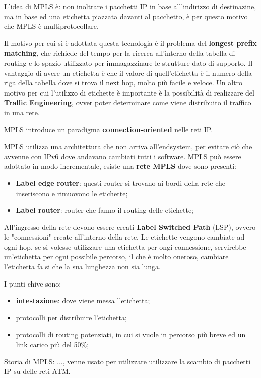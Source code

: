 \documentclass[12pt]{article}
\begin{document}
L'idea di MPLS \`e: non inoltrare i pacchetti IP in base all'indirizzo di destinazine, ma in base ed una etichetta piazzata davanti al pacchetto, \`e per questo motivo che MPLS \`e multiprotocollare.

Il motivo per cui si \`e adottata questa tecnologia \`e il problema del \textbf{longest prefix matching}, che richiede del tempo per la ricerca all'interno della tabella di routing e lo spazio utilizzato per immagazzinare le strutture dato di supporto. Il vantaggio di avere un etichetta \`e che il valore di quell'etichetta \`e il numero della riga della tabella dove si trova il next hop, molto pi\`u facile e veloce. Un altro motivo per cui l'utilizzo di etichette \`e importante \`e la possibilit\`a di realizzare del \textbf{Traffic Engineering}, ovver poter determinare come viene distribuito il traffico in una rete.

MPLS introduce un paradigma \textbf{connection-oriented} nelle reti IP.

MPLS utilizza una architettura che non arriva all'endsystem, per evitare ci\`o che avvenne con IPv6 dove andavano cambiati tutti i software. MPLS pu\`o essere adottato in modo incrementale, esiste una \textbf{rete MPLS} dove sono presenti:
\begin{itemize}
    \item \textbf{Label edge router}: questi router si trovano ai bordi della rete che inseriscono e rimuovono le etichette;
    \item \textbf{Label router}: router che fanno il routing delle etichette;
\end{itemize}
All'ingresso della rete devono essere creati \textbf{Label Switched Path} (LSP), ovvero le "connessioni" create all'interno della rete. Le etichette vengono cambiate ad ogni hop, se si volesse utilizzare una etichetta per ongi connessione, servirebbe un'etichetta per ogni possibile percorso, il che \`e molto oneroso, cambiare l'etichetta fa si che la sua lunghezza non sia lunga.

I punti chive sono:
\begin{itemize}
    \item \textbf{intestazione}: dove viene messa l'etichetta;
    \item protocolli per distribuire l'etichetta;
    \item protocolli di routing potenziati, in cui si vuole in percorso pi\`u breve ed un link carico pi\`u del 50\%;
\end{itemize}

Storia di MPLS: ..., venne usato per utilizzare utilizzare la scambio di pacchetti IP su delle reti ATM.
\end{document}
